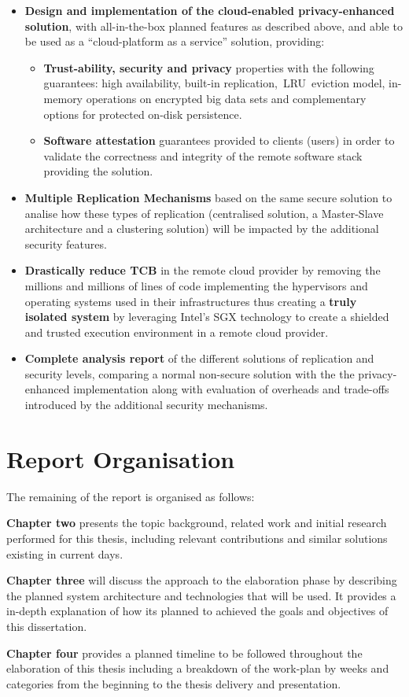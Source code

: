\begin{itemize}
  \item \textbf{Design and implementation of the cloud-enabled privacy-enhanced solution}, with all-in-the-box planned features as described above, and able to be used as a “cloud-platform as a service” solution, providing:
 	\begin{itemize}
 		\item \textbf{Trust-ability, security and privacy} properties with the following guarantees: high availability, built-in replication, LRU eviction model, in-memory operations on encrypted big data sets and complementary options for protected on-disk persistence.
 		\item \textbf{Software attestation} guarantees provided to clients (users) in order to validate the correctness and integrity of the remote software stack providing the solution.
 	\end{itemize}
  \item \textbf{Multiple Replication Mechanisms} based on the same secure solution to analise how these types of replication (centralised solution, a Master-Slave architecture and a clustering solution) will be impacted by the additional security features.
  \item \textbf{Drastically reduce TCB} in the remote cloud provider by removing the millions and millions of lines of code implementing the hypervisors and operating systems used in their infrastructures thus creating a \textbf{truly isolated system} by leveraging Intel's \gls{SGX} technology to create a shielded and trusted execution environment in a remote cloud provider.
  \item \textbf{Complete analysis report} of the different solutions of replication and security levels, comparing a normal non-secure solution with the the privacy-enhanced implementation along with evaluation of overheads and trade-offs introduced by the additional security mechanisms.
\end{itemize}

\section{Report Organisation}
\label{sec:report_organisation}

The remaining of the report is organised as follows:

\textbf{Chapter two} presents the topic background, related work and initial research performed for this thesis, including relevant contributions and similar solutions existing in current days.

\textbf{Chapter three} will discuss the approach to the elaboration phase by describing the planned system architecture and technologies that will be used. It provides a in-depth explanation of how its planned to achieved the goals and objectives of this dissertation.

\textbf{Chapter four} provides a planned timeline to be followed throughout the elaboration of this thesis including a breakdown of the work-plan by weeks and categories from the beginning to the thesis delivery and presentation.